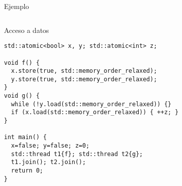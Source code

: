 \begin{frame}[fragile]{Ejemplo}
\begin{columns}

\begin{column}{.6\textwidth}
\begin{block}{Acceso a datos}
\begin{lstlisting}
std::atomic<bool> x, y; std::atomic<int> z;

void f() {
  x.store(true, std::memory_order_relaxed);
  y.store(true, std::memory_order_relaxed);
}
void g() {
  while (!y.load(std::memory_order_relaxed)) {}
  if (x.load(std::memory_order_relaxed)) { ++z; }
}

int main() {
  x=false; y=false; z=0;
  std::thread t1{f}; std::thread t2{g};
  t1.join(); t2.join();
  return 0;
}

\end{lstlisting}
\end{block}
\end{column}

\begin{column}{.4\textwidth}

\end{column}

\end{columns}
\end{frame}



